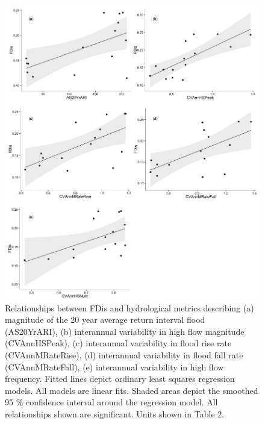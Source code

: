 \documentclass[openright,12pt,a4paper]{memoir}
\begin{document}
\begin{figure}[ht]
\begin{center}
\includegraphics[width=\textwidth,keepaspectratio=true]{fig1.png} %
\caption[Relationships between FDis and hydrological metrics describing flood magnitude.]{\small{Relationships between FDis and hydrological metrics describing (a) magnitude of the 20 year average return interval flood (AS20YrARI), (b) interannual variability in high flow magnitude (CVAnnHSPeak), (c) interannual variability in flood rise rate (CVAnnMRateRise), (d) interannual variability in flood fall rate (CVAnnMRateFall), (e) interannual variability in high flow frequency. Fitted lines depict ordinary least squares regression models. All models are linear fits. Shaded areas depict the smoothed 95 \% confidence interval around the regression model. All relationships shown are significant.  Units shown in Table 2.}}
\label{Ch3_F1} %
\end{center}
\end{figure}   
\clearpage
\end{document}
